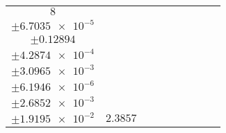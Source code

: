 \documentclass[8pt]{article}
\begin{document}
\begin{longtable}[l]{c c c c c c c c c}
$\num{8}$ & \begin{tabular}[c]{@{}c@{}}$\num{3.034e-2}$ \\ $\pm\num{6.7035e-5}$\end{tabular} & \begin{tabular}[c]{@{}c@{}}$\num{0.10893}$ \\ $\pm\num{0.12894}$\end{tabular} & \begin{tabular}[c]{@{}c@{}}$\num{9.3663}$ \\ $\pm\num{4.2874e-4}$\end{tabular} & \begin{tabular}[c]{@{}c@{}}$\num{740.03}$ \\ $\pm\num{3.0965e-3}$\end{tabular} & \begin{tabular}[c]{@{}c@{}}$\num{1.4805}$ \\ $\pm\num{6.1946e-6}$\end{tabular} & \begin{tabular}[c]{@{}c@{}}$\num{1.1754}$ \\ $\pm\num{2.6852e-3}$\end{tabular} & \begin{tabular}[c]{@{}c@{}}$\num{4.0105}$ \\ $\pm\num{1.9195e-2}$\end{tabular} & $\num{2.3857}$\\
\bottomrule
\end{longtable}
\end{document}
